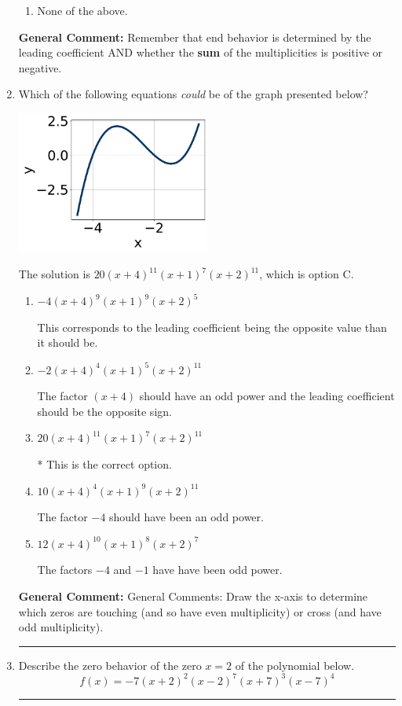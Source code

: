 \documentclass{extbook}[14pt]
\newcommand{\litem}[1]{\item #1

\rule{\textwidth}{0.4pt}}
\begin{document}
\begin{enumerate}
{\begin{enumerate}[label=\Alph*.]
\begin{multicols}{2}
\end{multicols}\item None of the above.\end{enumerate}
\textbf{General Comment:} Remember that end behavior is determined by the leading coefficient AND whether the \textbf{sum} of the multiplicities is positive or negative.
}
\litem{
Which of the following equations \textit{could} be of the graph presented below?

\begin{center}
    \includegraphics[width=0.5\textwidth]{../Figures/polyGraphToFunctionA.png}
\end{center}




The solution is \( 20(x + 4)^{11} (x + 1)^{7} (x + 2)^{11} \), which is option C.\begin{enumerate}[label=\Alph*.]
\item \( -4(x + 4)^{9} (x + 1)^{9} (x + 2)^{5} \)

This corresponds to the leading coefficient being the opposite value than it should be.
\item \( -2(x + 4)^{4} (x + 1)^{5} (x + 2)^{11} \)

The factor $(x + 4)$ should have an odd power and the leading coefficient should be the opposite sign.
\item \( 20(x + 4)^{11} (x + 1)^{7} (x + 2)^{11} \)

* This is the correct option.
\item \( 10(x + 4)^{4} (x + 1)^{9} (x + 2)^{11} \)

The factor $-4$ should have been an odd power.
\item \( 12(x + 4)^{10} (x + 1)^{8} (x + 2)^{7} \)

The factors $-4$ and $-1$ have have been odd power.
\end{enumerate}

\textbf{General Comment:} General Comments: Draw the x-axis to determine which zeros are touching (and so have even multiplicity) or cross (and have odd multiplicity).
}
\litem{
Describe the zero behavior of the zero $x = 2$ of the polynomial below.
\[ f(x) = -7(x + 2)^{2}(x - 2)^{7}(x + 7)^{3}(x - 7)^{4} \]

}
\end{enumerate}
\end{document}
